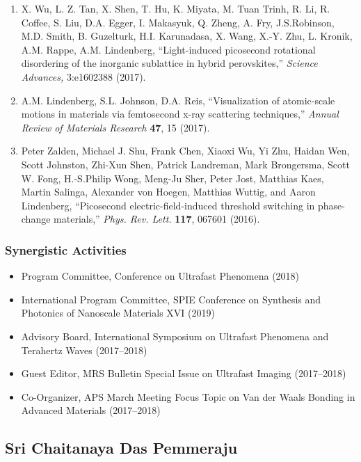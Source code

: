 \begin{enumerate}
    \item X. Wu, L. Z. Tan, X. Shen, T. Hu, K. Miyata, M. Tuan Trinh, R. Li, R. Coffee, S. Liu, D.A. Egger, I. Makasyuk, Q. Zheng, A. Fry, J.S.Robinson, M.D. Smith, B. Guzelturk, H.I. Karunadasa, X. Wang, X.-Y. Zhu, L. Kronik, A.M. Rappe, A.M. Lindenberg, “Light-induced picosecond rotational disordering of the inorganic sublattice in hybrid perovskites,” {\it Science Advances,} 3:e1602388 (2017).  
    \item A.M. Lindenberg, S.L. Johnson, D.A. Reis, “Visualization of atomic-scale motions in materials via femtosecond x-ray scattering techniques,” {\it Annual Review of Materials Research} {\bf 47}, 15 (2017).
    \item Peter Zalden, Michael J. Shu, Frank Chen, Xiaoxi Wu, Yi Zhu, Haidan Wen, Scott Johnston, Zhi-Xun Shen, Patrick Landreman, Mark Brongersma, Scott W. Fong, H.-S.Philip Wong, Meng-Ju Sher, Peter Jost, Matthias Kaes, Martin Salinga, Alexander von Hoegen, Matthias Wuttig, and Aaron Lindenberg, “Picosecond electric-field-induced threshold switching in phase-change materials,” {\it Phys. Rev. Lett.} {\bf 117}, 067601 (2016). 
\end{enumerate}

\subsubsection*{Synergistic Activities}

\begin{itemize}
    \item Program Committee, Conference on Ultrafast Phenomena (2018)
    \item International Program Committee, SPIE Conference on Synthesis and Photonics of Nanoscale Materials XVI (2019)
    \item Advisory Board, International Symposium on Ultrafast Phenomena and Terahertz Waves (2017–2018)
    \item Guest Editor, MRS Bulletin Special Issue on Ultrafast Imaging (2017–2018)
    \item Co-Organizer, APS March Meeting Focus Topic on Van der Waals Bonding in Advanced Materials (2017–2018)
\end{itemize}

\clearpage

\subsection*{Sri Chaitanaya Das Pemmeraju}

